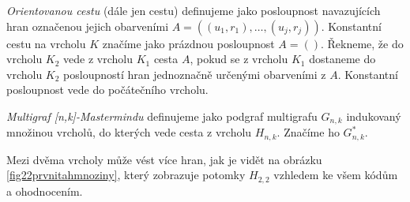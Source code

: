 \begin{definice}
    \emph{Orientovanou cestu} (dále jen cestu) definujeme jako posloupnost navazujících hran označenou jejich obarveními $A = ((u_1,r_1), \dots, (u_j, r_j))$. Konstantní cestu na vrcholu $K$ značíme jako prázdnou posloupnost $A = ()$. Řekneme, že do vrcholu $K_2$ vede z vrcholu $K_1$ cesta $A$, pokud se z vrcholu $K_1$ dostaneme do vrcholu $K_2$ posloupností hran jednoznačně určenými obarveními z $A$. Konstantní posloupnost vede do počátečního vrcholu. 
\end{definice}

\begin{definice}
  \emph{Multigraf [n,k]-Mastermindu} definujeme jako podgraf multigrafu $G_{n,k}$ indukovaný množinou vrcholů, do kterých vede cesta z vrcholu $H_{n,k}$. Značíme ho $G_{n,k}^*$.
  
\end{definice}

\begin{pozn}
    Mezi dvěma vrcholy může vést více hran, jak je vidět na obrázku \ref{fig22prvnitahmnoziny}, který zobrazuje potomky $H_{2,2}$ vzhledem ke všem kódům a ohodnocením. 
\end{pozn}


